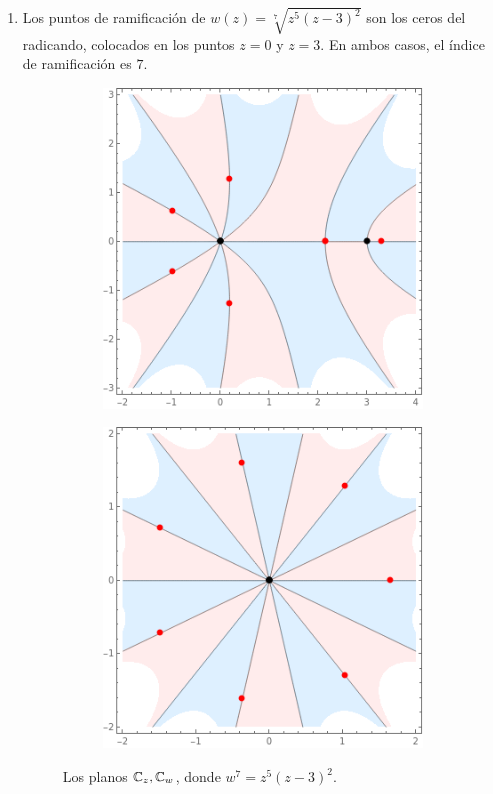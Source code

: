 \begin{solution}
\begin{itemize}
\begin{enumerate}[label=\alph*)]
        \item Los puntos de ramificación de $w(z) = \sqrt [7] {z^5 (z-3)^2}$ son los ceros del radicando, colocados en los puntos $z = 0$ y $z = 3$. En ambos casos, el índice de ramificación es $7$.
        \begin{figure}[h]
            \centering
            \begin{subfigure}{.4\textwidth}
                \centering
                \includegraphics[scale=0.4]{ramification/7-z.png}
            \end{subfigure}
            \begin{subfigure}{.4\textwidth}
                \centering
                \includegraphics[scale=0.4]{ramification/7-w.png}
            \end{subfigure}
            \caption{Los planos $\mathbb C_z, \mathbb C_w$, donde $w^7 = z^5 (z-3)^2$.}
        \end{figure}
        

\end{enumerate}
\end{itemize}
\end{solution}
